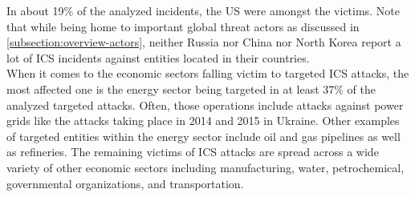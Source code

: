 \documentclass[runningheads]{llncs}
\begin{document}
In about 19\% of the analyzed incidents, the US were amongst the victims.
Note that while being home to important global threat actors as discussed in \autoref{subsection:overview-actors}, neither Russia nor China nor North Korea report a lot of ICS incidents against entities located in their countries.
\\
When it comes to the economic sectors falling victim to targeted ICS attacks, the most affected one is the energy sector being targeted in at least 37\% of the analyzed targeted attacks.
Often, those operations include attacks against power grids like the attacks taking place in 2014 and 2015 in Ukraine.
Other examples of targeted entities within the energy sector include oil and gas pipelines as well as refineries.
The remaining victims of ICS attacks are spread across a wide variety of other economic sectors including manufacturing, water, petrochemical, governmental organizations, and transportation.
\end{document}
